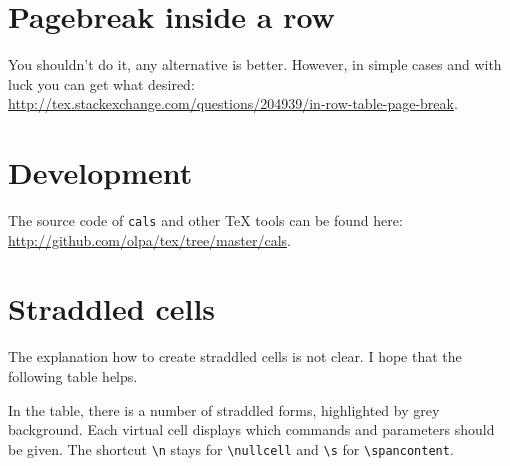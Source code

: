 \documentclass{article}
\begin{document}
\section{Pagebreak inside a row}
You shouldn't do it, any alternative is better. However, in simple
cases and with luck you can get what desired:
\url{http://tex.stackexchange.com/questions/204939/in-row-table-page-break}.

\section{Development}
The source code of \verb|cals| and other \TeX{} tools can be found here:
\url{http://github.com/olpa/tex/tree/master/cals}.

\section{Straddled cells}
The explanation how to create straddled cells is not clear.
I hope that the following table helps.

In the table, there is a number of straddled forms,
highlighted by grey background. Each virtual cell
displays which commands and parameters should be given.
The shortcut \verb|\n| stays for \verb|\nullcell|
and \verb|\s| for \verb|\spancontent|.

\newpage
\end{document}
